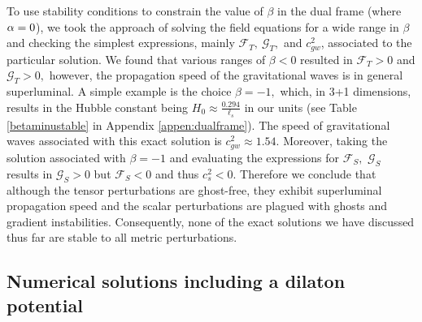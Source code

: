 \documentclass[amsmath,amssymb,11pt]{article}
\begin{document}
To use stability conditions to constrain the value of $\beta$ in the dual frame (where $\alpha=0$), we took the approach of solving the field equations for a wide range in $\beta$ and checking the simplest expressions, mainly $\mathcal{F}_T, \ \mathcal{G}_T,$ and $c_{gw}^2$, associated to the particular solution. We found that various ranges of $\beta<0$ resulted in $\mathcal{F}_T>0$ and $\mathcal{G}_T>0,$ however, the propagation speed of the gravitational waves is in general superluminal. A simple example is the choice $\beta=-1,$ which, in 3+1 dimensions, results in the Hubble constant being $H_0\approx \frac{0.294}{\ell_s}$ in our units (see Table \ref{betaminustable} in Appendix \ref{appen:dualframe}). The speed of gravitational waves associated with this exact solution is $c_{gw}^2\approx 1.54.$ Moreover, taking the solution associated with $\beta=-1$ and evaluating the expressions for $\mathcal{F}_S,$ $\mathcal{G}_S$ results in $\mathcal{G}_S>0$ but $\mathcal{F}_S<0$ and thus $c_s^2<0.$ Therefore we conclude that although the tensor perturbations are ghost-free, they exhibit superluminal propagation speed and the scalar perturbations are plagued with ghosts and gradient instabilities. Consequently, none of the exact solutions we have discussed thus far are stable to all metric perturbations.





\subsection{Numerical solutions including a dilaton potential}\label{sec:potential}
\end{document}
